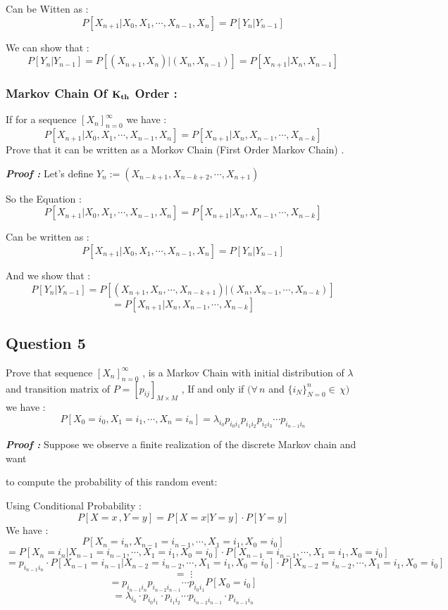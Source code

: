 \documentclass[a4paper]{article}
\begin{document}
			Can be Witten as : \[P[X_{n+1} | X_0 , X_1 , \cdots , X_{n-1} , X_{n}] = P[Y_n| Y_{n-1}]\]
			
			We can show that :
			\[P[Y_n| Y_{n-1}]  = P[ (X_{n+1} , X_n ) | (X_n ,  X_{n-1}) ] = P[X_{n+1} | X_{n} , X_{n-1}]\]
		
		\subsubsection{Markov Chain Of \texorpdfstring{$\bf K_{th}$}{Lg} Order : }
		
		If for a sequence $\displaystyle{[X_{n}]_{n=0}^{\infty}}$ we have : 
		\[P[X_{n+1} | X_0 , X_1 , \cdots , X_{n-1} , X_{n}] = P[X_{n+1} | X_{n} , X_{n-1} , \cdots , X_{n-k}] \]Prove that it can be written as a Morkov Chain (First Order Markov Chain) .
		
		\newpage
		\large{\bf \emph{Proof :}}
		Let's define $Y_{n} := (X_{n-k+1} , X_{n-k+2} , \cdots , X_{n+1})$
		
		So the Equation : \[P[X_{n+1} | X_0 , X_1 , \cdots , X_{n-1} , X_{n}] = P[X_{n+1} | X_{n} , X_{n-1} , \cdots , X_{n-k}] \]
		
		Can be written as :\[P[X_{n+1} | X_0 , X_1 , \cdots , X_{n-1} , X_{n}] = P[Y_n | Y_{n-1}] \]
		
		And we show that : \[P[Y_n | Y_{n-1}] = P[(X_{n+1}, X_n , \cdots , X_{n-k+1}) |(X_{n} , X_{n-1} , \cdots , X_{n-k})]\] \[= P[X_{n+1} | X_{n} , X_{n-1} , \cdots , X_{n-k}]\]
		
		\subsection{\Large Question 5}
		Prove that sequence $[X_{n}]_{n=0}^{\infty}$ , is a Markov Chain with initial distribution of $\lambda$ and transition matrix of $P = [p_{ij}]_{M\times M}$ , If and only if $(\forall\,n$ and $\displaystyle{\{i_N\}_{N=0}^{n} \in\,\chi)}$ we have :\[P[X_0 = i_0 , X_1 = i_1 , \cdots , X_n = i_n] = \lambda_{i_0}p_{i_0i_1}p_{i_1i_2}p_{i_2i_3}\cdots p_{i_{n-1}i_{n}}\]
		
		\large{\bf \emph{Proof :}}
		Suppose we observe a finite realization of the discrete Markov chain and want 
		
		to compute the probability of this random event:
		
		Using Conditional Probability  : \[P[X = x \,, Y= y] = P[X=x | Y=y]\cdot P[Y=y]\]
		We have :
		\[P[X_n = i_n , X_{n-1} = i_{n-1} , \cdots , X_1 = i_1 , X_0 = i_0]\]\[= P[X_n = i_n | X_{n-1} = i_{n-1} , \cdots , X_1 = i_1 , X_0 = i_0]\cdot P[X_{n-1} = i_{n-1}, \cdots , X_1 = i_1 , X_0 = i_0]\]
		\[ = p_{i_{n-1}i_{n}} \cdot P[X_{n-1} = i_{n-1} | X_{n-2} = i_{n-2} , \cdots , X_1 = i_1 , X_0 = i_0]\cdot P[X_{n-2} = i_{n-2}, \cdots , X_1 = i_1 , X_0 = i_0]\]
		\[=\, \, \vdots\]
		\[= p_{i_{n-1}i_{n}}p_{i_{n-2}i_{n-1}} \cdots p_{i_0i_1} P[X_0 = i_0]\]
		\[= \lambda_{i_0}\cdot p_{i_{0}i_{1}}\cdot p_{i_{1}i_{2}}\cdots p_{i_{n-2}i_{n-1}}\cdot p_{i_{n-1}i_{n}} \]
		
\end{document}
